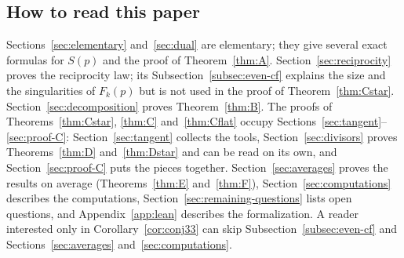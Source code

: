 \subsection*{How to read this paper}
Sections~\ref{sec:elementary} and~\ref{sec:dual} are elementary; they give several exact formulas for $S(p)$ and the proof of Theorem~\ref{thm:A}. Section~\ref{sec:reciprocity} proves the reciprocity law; its Subsection~\ref{subsec:even-cf} explains the size and the singularities of $F_k(p)$ but is not used in the proof of Theorem~\ref{thm:Cstar}. Section~\ref{sec:decomposition} proves Theorem~\ref{thm:B}. The proofs of Theorems~\ref{thm:Cstar}, \ref{thm:C} and~\ref{thm:Cflat} occupy Sections~\ref{sec:tangent}--\ref{sec:proof-C}: Section~\ref{sec:tangent} collects the tools, Section~\ref{sec:divisors} proves Theorems~\ref{thm:D} and~\ref{thm:Dstar} and can be read on its own, and Section~\ref{sec:proof-C} puts the pieces together. Section~\ref{sec:averages} proves the results on average (Theorems~\ref{thm:E} and~\ref{thm:F}), Section~\ref{sec:computations} describes the computations, Section~\ref{sec:remaining-questions} lists open questions, and Appendix~\ref{app:lean} describes the formalization. A reader interested only in Corollary~\ref{cor:conj33} can skip Subsection~\ref{subsec:even-cf} and Sections~\ref{sec:averages} and~\ref{sec:computations}.

